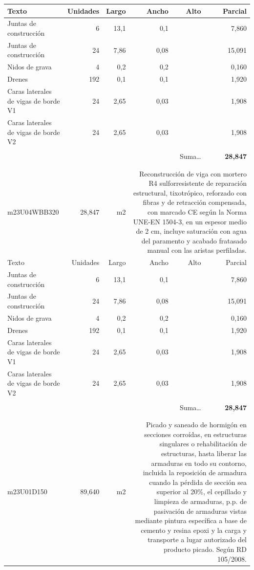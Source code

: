 \documentclass{book}%
\begin{document}
\begin{longtable}{lrrrrr}
Texto&Unidades&Largo&Ancho&Alto&Parcial\\%
\hline%
\multicolumn{1}{p{3.5cm}}{Juntas de construcción}&6&13,1&0,1&&     7,860\\%
\multicolumn{1}{p{3.5cm}}{Juntas de construcción}&24&7,86&0,08&&    15,091\\%
\multicolumn{1}{p{3.5cm}}{Nidos de grava}&4&0,2&0,2&&     0,160\\%
\multicolumn{1}{p{3.5cm}}{Drenes}&192&0,1&0,1&&     1,920\\%
\multicolumn{1}{p{3.5cm}}{Caras laterales de vigas de borde V1}&24&2,65&0,03&&     1,908\\%
\multicolumn{1}{p{3.5cm}}{Caras laterales de vigas de borde V2}&24&2,65&0,03&&     1,908\\%
&&&&&\\%
\multicolumn{5}{r}{Suma\ldots}&\textbf{    28,847}\\%
\hline%
&&&&&\\%
&&&&&\\%
m23U04WBB320&    28,847& m2&\multicolumn{3}{p{6cm}}{\scriptsize Reconstrucción de viga con mortero R4 sulforresistente de reparación estructural, tixotrópico, reforzado con fibras y de retracción compensada, con marcado CE según la Norma UNE-EN 1504-3, en un espesor medio de 2 cm, incluye saturación con agua del paramento y acabado fratasado manual con las aristas perfiladas.\normalsize}\\%
Texto&Unidades&Largo&Ancho&Alto&Parcial\\%
\hline%
\multicolumn{1}{p{3.5cm}}{Juntas de construcción}&6&13,1&0,1&&     7,860\\%
\multicolumn{1}{p{3.5cm}}{Juntas de construcción}&24&7,86&0,08&&    15,091\\%
\multicolumn{1}{p{3.5cm}}{Nidos de grava}&4&0,2&0,2&&     0,160\\%
\multicolumn{1}{p{3.5cm}}{Drenes}&192&0,1&0,1&&     1,920\\%
\multicolumn{1}{p{3.5cm}}{Caras laterales de vigas de borde V1}&24&2,65&0,03&&     1,908\\%
\multicolumn{1}{p{3.5cm}}{Caras laterales de vigas de borde V2}&24&2,65&0,03&&     1,908\\%
&&&&&\\%
\multicolumn{5}{r}{Suma\ldots}&\textbf{    28,847}\\%
\hline%
&&&&&\\%
&&&&&\\%
m23U01D150&    89,640& m2&\multicolumn{3}{p{6cm}}{\scriptsize Picado y saneado de hormigón en secciones corroídas, en estructuras singulares o rehabilitación de estructuras, hasta liberar las armaduras en todo su contorno, incluida la reposición de armadura cuando la pérdida de sección sea superior al 20\%, el cepillado y limpieza de armaduras, p.p. de pasivación de armaduras vistas mediante pintura específica a base de cemento y resina epoxi y la carga y transporte a lugar autorizado del producto picado. Según RD 105/2008.\normalsize}\\%

\end{longtable}
\end{document}

